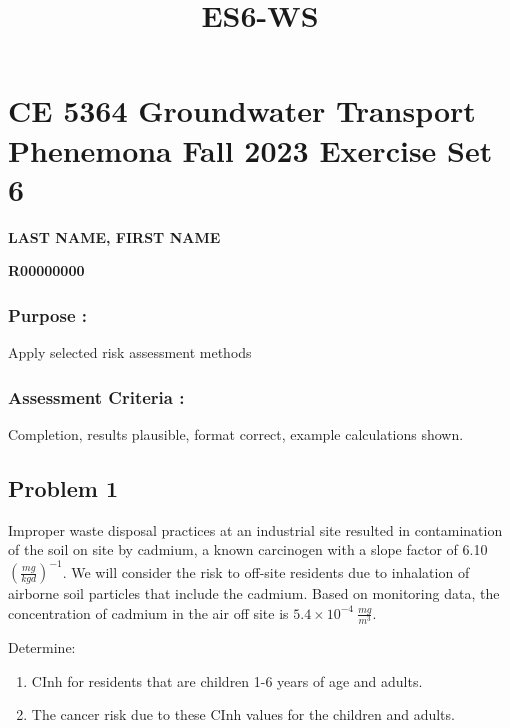 \documentclass[11pt]{article}
\title{ES6-WS}
\providecommand{\tightlist}{%
      \setlength{\itemsep}{0pt}\setlength{\parskip}{0pt}}
\begin{document}
    
    \maketitle
    
    

    
    \hypertarget{ce-5364-groundwater-transport-phenemona-fall-2023-exercise-set-6}{%
\section{\texorpdfstring{CE 5364 Groundwater Transport Phenemona Fall
2023 Exercise Set
6}{CE 5364 Groundwater Transport Phenemona   Fall 2023 Exercise Set 6}}\label{ce-5364-groundwater-transport-phenemona-fall-2023-exercise-set-6}}

\textbf{LAST NAME, FIRST NAME}

\textbf{R00000000}

\hypertarget{purpose}{%
\subsubsection{Purpose :}\label{purpose}}

Apply selected risk assessment methods

\hypertarget{assessment-criteria}{%
\subsubsection{Assessment Criteria :}\label{assessment-criteria}}

Completion, results plausible, format correct, example calculations
shown.

    \hypertarget{problem-1}{%
\subsection{Problem 1}\label{problem-1}}

Improper waste disposal practices at an industrial site resulted in
contamination of the soil on site by cadmium, a known carcinogen with a
slope factor of 6.10 \((\frac{mg}{kg d})^{-1}\). We will consider the
risk to off-site residents due to inhalation of airborne soil particles
that include the cadmium. Based on monitoring data, the concentration of
cadmium in the air off site is \(5.4 \times 10^{-4}~\frac{mg}{m^3}\).

Determine:

\begin{enumerate}
\def\labelenumi{\arabic{enumi}.}
\tightlist
\item
  CInh for residents that are children 1-6 years of age and adults.
\item
  The cancer risk due to these CInh values for the children and adults.
\end{enumerate}
\end{document}
